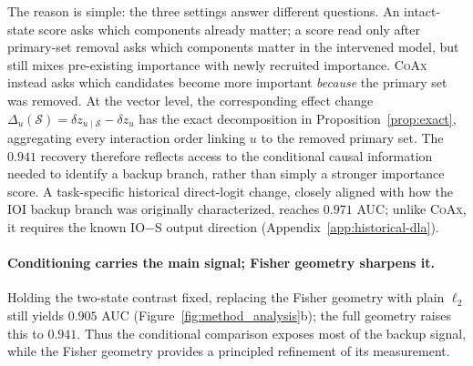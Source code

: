 \documentclass{article} %
\theoremstyle{plain}
\theoremstyle{definition}
\newcommand{\coax}{\textsc{CoAx}\xspace}
\newcommand{\dz}{\delta z}
\newcommand{\Sset}{\mathcal{S}}
\begin{document}
The reason is simple: the three settings answer different questions.
An intact-state score asks which components already matter; a score read only after primary-set removal asks which components matter in the intervened model,
but still mixes pre-existing importance with newly recruited importance.
\coax instead asks which candidates become more important \emph{because} the primary set was removed.
At the vector level, the corresponding effect change
$\Delta_u(\Sset)=\dz_{u\mid\Sset}-\dz_u$ has the exact decomposition in Proposition~\ref{prop:exact}, aggregating every interaction order linking $u$ to the removed primary set.
The $0.941$ recovery therefore reflects access to the conditional causal information needed to identify a backup branch, rather than simply a stronger importance score. A task-specific historical direct-logit change, closely aligned with how the IOI backup branch was originally characterized, reaches $0.971$ AUC; unlike \coax, it requires the known IO$-$S output direction (Appendix~\ref{app:historical-dla}).

\paragraph{Conditioning carries the main signal; Fisher geometry sharpens it.}
Holding the two-state contrast fixed, replacing the Fisher geometry with plain $\ell_2$ still yields $0.905$ AUC (Figure~\ref{fig:method_analysis}b); the full geometry raises this to $0.941$.
Thus the conditional comparison exposes most of the backup signal, while the Fisher geometry provides a principled refinement of its measurement.

\end{document}
